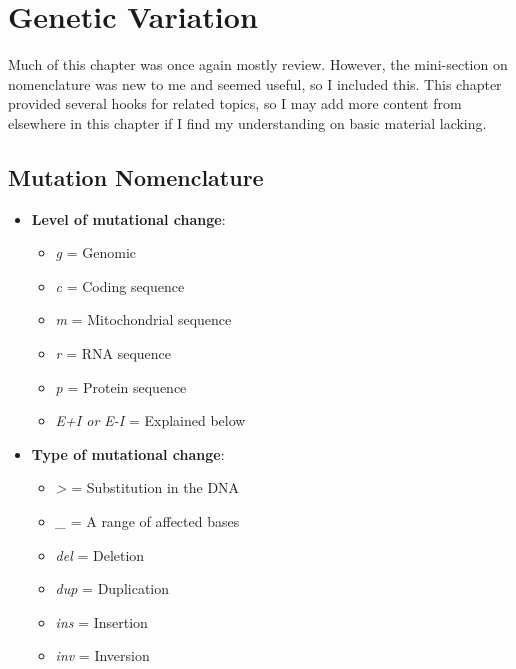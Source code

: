 \documentclass{inVerba-notes}
\begin{document}
\chapter{Genetic Variation}\label{Genetic Variation}
\begin{adjustwidth}{1cm}{1cm}
  Much of this chapter was once again mostly review. However, the mini-section on nomenclature was new to me and seemed useful, so I included this. This chapter provided several hooks for related topics, so I may add more content from elsewhere in this chapter if I find my understanding on basic material lacking.
\end{adjustwidth}

\section{Mutation Nomenclature}\label{Mutation Nomenclature}
\begin{multicols}{2}
\begin{itemize}
  \item \textbf{Level of mutational change}:
    \begin{itemize}
      \item \emph{g} = Genomic
      \item \emph{c} = Coding sequence
      \item \emph{m} = Mitochondrial sequence
      \item \emph{r} = RNA sequence
      \item \emph{p} = Protein sequence
      \item \emph{E+I or E-I} = Explained below
    \end{itemize}
  \item \textbf{Type of mutational change}:
    \begin{itemize}
      \item \emph{>} = Substitution in the DNA
      \item \emph{\_} = A range of affected bases
      \item \emph{del} = Deletion
      \item \emph{dup} = Duplication
      \item \emph{ins} = Insertion
      \item \emph{inv} = Inversion
    \end{itemize}
  \end{itemize}
  \end{multicols}
\end{document}
